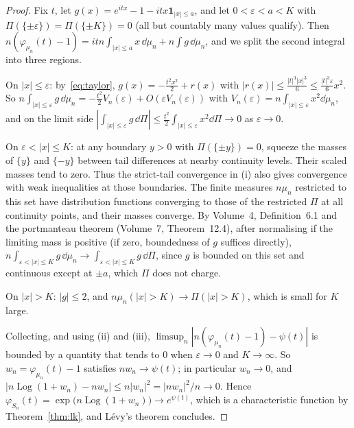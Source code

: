\begin{proof}
Fix $t$, let $g(x)=e^{itx}-1-itx\mathbf 1_{|x|\le a}$, and let $0<\varepsilon<a<K$ with $\Pi(\{\pm\varepsilon\})=\Pi(\{\pm K\})=0$ (all but countably many values qualify).
Then $n(\varphi_{\mu_n}(t)-1)=itn\int_{|x|\le a}x\,\dd\mu_n+n\int g\,\dd\mu_n$, and we split the second integral into three regions.

On $|x|\le\varepsilon$: by~\eqref{eq:taylor}, $g(x)=-\frac{t^2x^2}2+r(x)$ with $|r(x)|\le\frac{|t|^3|x|^3}6\le\frac{|t|^3\varepsilon}6x^2$. So
$n\int_{|x|\le\varepsilon}g\,\dd\mu_n=-\frac{t^2}2V_n(\varepsilon)+O(\varepsilon V_n(\varepsilon))$ with $V_n(\varepsilon)=n\int_{|x|\le\varepsilon}x^2\dd\mu_n$, and on the limit side
$|\int_{|x|\le\varepsilon}g\,\dd\Pi|\le\frac{t^2}2\int_{|x|\le\varepsilon}x^2\dd\Pi\to0$ as $\varepsilon\to0$.

On $\varepsilon<|x|\le K$: at any boundary $y>0$ with $\Pi(\{\pm y\})=0$, squeeze the masses of $\{y\}$ and $\{-y\}$ between tail differences at nearby continuity levels. Their scaled masses tend to zero. Thus the strict-tail convergence in (i) also gives convergence with weak inequalities at those boundaries. The finite measures $n\mu_n$ restricted to this set have distribution functions converging to those of the restricted $\Pi$ at all continuity points, and their masses converge. By Volume~4, Definition~6.1 and the portmanteau theorem (Volume~7, Theorem~12.4), after normalising if the limiting mass is positive (if zero, boundedness of $g$ suffices directly), $n\int_{\varepsilon<|x|\le K}g\,\dd\mu_n\to\int_{\varepsilon<|x|\le K}g\,\dd\Pi$, since $g$ is bounded on this set and continuous except at $\pm a$, which
$\Pi$ does not charge.

On $|x|>K$: $|g|\le2$, and $n\mu_n(|x|>K)\to\Pi(|x|>K)$, which is small for $K$ large.

Collecting, and using (ii) and (iii), $\limsup_n|n(\varphi_{\mu_n}(t)-1)-\psi(t)|$ is bounded by a quantity that tends to $0$ when $\varepsilon\to0$ and $K\to\infty$. So
$w_n=\varphi_{\mu_n}(t)-1$ satisfies $nw_n\to\psi(t)$; in particular $w_n\to0$, and $|n\operatorname{Log}(1+w_n)-nw_n|\le n|w_n|^2=|nw_n|^2/n\to0$. Hence
$\varphi_{S_n}(t)=\exp\bigl(n\operatorname{Log}(1+w_n)\bigr)\to e^{\psi(t)}$, which is a characteristic function by Theorem~\ref{thm:lk}, and L\'evy's theorem concludes.
\end{proof}

